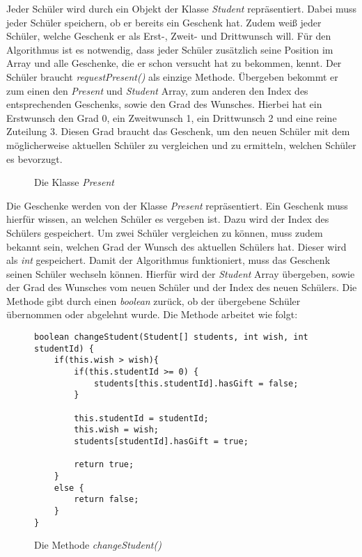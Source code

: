 \documentclass[a4paper, 12pt]{scrartcl}
\begin{document}
Jeder Schüler wird durch ein Objekt der Klasse \emph{Student} repräsentiert. Dabei muss jeder Schüler speichern, ob er bereits ein Geschenk hat. Zudem weiß jeder Schüler, welche Geschenk er als Erst-, Zweit- und Drittwunsch will. Für den Algorithmus ist es notwendig, dass jeder Schüler zusätzlich seine Position im Array und alle Geschenke, die er schon versucht hat zu bekommen, kennt. Der Schüler braucht \emph{requestPresent()} als einzige Methode. Übergeben bekommt er zum einen den \emph{Present} und \emph{Student} Array, zum anderen den Index des entsprechenden Geschenks, sowie den Grad des Wunsches. Hierbei hat ein Erstwunsch den Grad 0, ein Zweitwunsch 1, ein Drittwunsch 2 und eine reine Zuteilung 3. Diesen Grad braucht das Geschenk, um den neuen Schüler mit dem möglicherweise aktuellen Schüler zu vergleichen und zu ermitteln, welchen Schüler es bevorzugt.

\begin{figure}[h]
    \centering
    \caption{Die Klasse \emph{Present}}
\end{figure}

Die Geschenke werden von der Klasse \emph{Present} repräsentiert. Ein Geschenk muss hierfür wissen, an welchen Schüler es vergeben ist. Dazu wird der Index des Schülers gespeichert. Um zwei Schüler vergleichen zu können, muss zudem bekannt sein, welchen Grad der Wunsch des aktuellen Schülers hat. Dieser wird als \emph{int} gespeichert. Damit der Algorithmus funktioniert, muss das Geschenk seinen Schüler wechseln können. Hierfür wird der \emph{Student} Array übergeben, sowie der Grad des Wunsches vom neuen Schüler und der Index des neuen Schülers. Die Methode gibt durch einen \emph{boolean} zurück, ob der übergebene Schüler übernommen oder abgelehnt wurde. Die Methode arbeitet wie folgt:

\begin{figure}[h]
\centering
\begin{lstlisting}
boolean changeStudent(Student[] students, int wish, int studentId) {
	if(this.wish > wish){
		if(this.studentId >= 0) {
			students[this.studentId].hasGift = false;
		}

		this.studentId = studentId;
		this.wish = wish;
		students[studentId].hasGift = true;
			
		return true;
	}
	else {
		return false;
	}
}
\end{lstlisting}
\caption{Die Methode \emph{changeStudent()}}
\end{figure}
\end{document}
